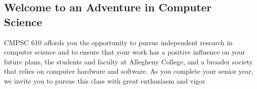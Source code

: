 \documentclass[11pt]{article}
\begin{document}
\subsection*{Welcome to an Adventure in Computer Science}

CMPSC 610 affords you the opportunity to pursue independent research in
computer science and to ensure that your work has a positive influence on your
future plans, the students and faculty at Allegheny College, and a broader
society that relies on computer hardware and software. As you complete your
senior year, we invite you to pursue this class with great enthusiasm and
vigor.
\end{document}

